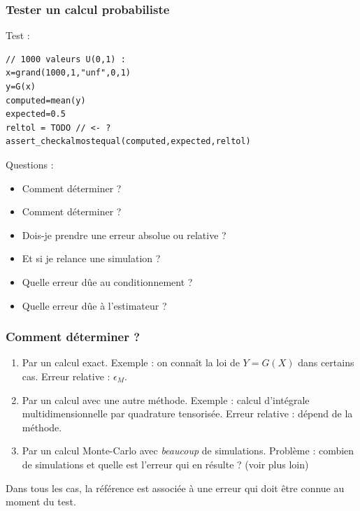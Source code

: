 \documentclass{beamer}
\begin{document}
\begin{frame}[containsverbatim]
\frametitle{Tester un calcul probabiliste}

Test :
\begin{lstlisting}
// 1000 valeurs U(0,1) :
x=grand(1000,1,"unf",0,1)
y=G(x)
computed=mean(y)
expected=0.5
reltol = TODO // <- ?
assert_checkalmostequal(computed,expected,reltol)
\end{lstlisting}

Questions :
\begin{itemize}
\item Comment déterminer  ?
\item Comment déterminer  ?
\item Dois-je prendre une erreur absolue ou relative ?
\item Et si je relance une simulation ?
\item Quelle erreur dûe au conditionnement ?
\item Quelle erreur dûe à l'estimateur ?
\end{itemize}

\end{frame}

\begin{frame}[containsverbatim]
\frametitle{Comment déterminer  ?}

\begin{enumerate}
\item Par un calcul exact. Exemple : on connaît la loi de 
$Y=G(X)$ dans certains cas. Erreur relative : $\epsilon_M$.
\item Par un calcul avec une autre méthode. Exemple : 
calcul d'intégrale multidimensionnelle par quadrature tensorisée.  
Erreur relative : dépend de la méthode.
\item Par un calcul Monte-Carlo avec \emph{beaucoup} de simulations. 
Problème : combien de simulations et quelle est l'erreur qui en résulte ? 
(voir plus loin)
\end{enumerate}

Dans tous les cas, la référence  est associée 
à une erreur qui doit être connue au moment du test.

\end{frame}
\end{document}
